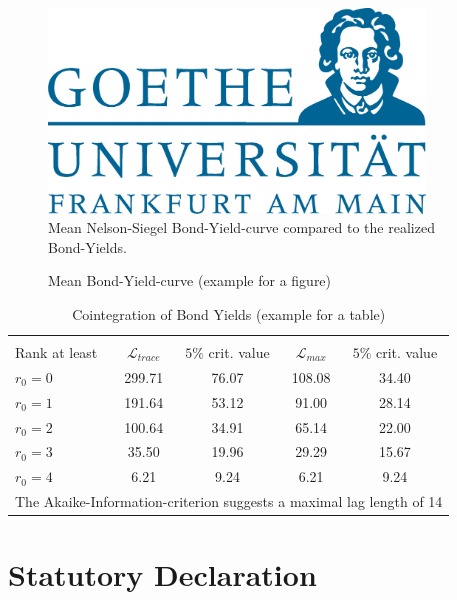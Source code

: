 \documentclass[12pt,a4paper]{article}
\begin{document}
\begin{figure}[!h]
\begin{center}\caption{Mean Bond-Yield-curve (example for a figure)\label{fig:average}}
\includegraphics[width=100mm]{GU-Logo-blau-CMYK.eps}\\
\tiny Mean Nelson-Siegel Bond-Yield-curve compared to the realized
Bond-Yields.
\end{center}
\end{figure}

\begin{table}[h]\small
\begin{center}\caption{Cointegration of Bond Yields (example for a table)\label{tab:Coint}}
\begin{tabular}{lcccc}
& & & & \\
\hline
& & & & \\
Rank at least & $\mathscr{L}_{trace}$ & $5\%$ crit. value & $\mathscr{L}_{max}$ & $5\%$ crit. value \\
$r_0=0$ & 299.71 & 76.07 & 108.08 & 34.40 \\
$r_0=1$ & 191.64 & 53.12 & 91.00 & 28.14 \\
$r_0=2$ & 100.64 & 34.91 & 65.14 & 22.00 \\
$r_0=3$ & 35.50 & 19.96 & 29.29 & 15.67 \\
$r_0=4$ & 6.21 & 9.24 & 6.21 & 9.24 \\
\hline
\multicolumn{5}{l}{\tiny The Akaike-Information-criterion suggests a maximal lag length of 14}\\
\end{tabular}
\end{center}
\end{table}


\clearpage


\newpage
\thispagestyle{empty}
\section*{Statutory Declaration}\label{statutory-declaration}
\end{document}
